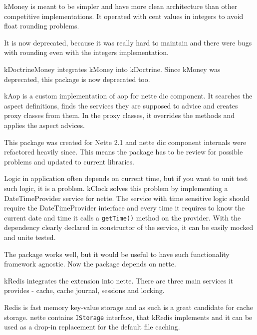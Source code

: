\gls{kMoney} is meant to be simpler and have more clean architecture than other competitive implementations. It operated with cent values in integers to avoid float rounding problems.

It is now deprecated, because it was really hard to maintain and there were bugs with rounding even with the integers implementation.

 \label{sec:state:doctrine-money}

\gls{kDoctrineMoney} integrates \gls{kMoney} into \gls{kDoctrine}. Since \gls{kMoney} was deprecated, this package is now deprecated too.

 \label{sec:state:aop}

\gls{kAop} is a custom implementation of \gls{aop} for \gls{nette} \gls{dic} component. It searches the aspect definitions, finds the services they are supposed to advice and creates proxy classes from them. In the proxy classes, it overrides the methods and applies the aspect advices.

This package was created for Nette 2.1 and \gls{nette} \gls{dic} component internals were refactored heavily since. This means the package has to be review for possible problems and updated to current libraries.

 \label{sec:state:clock}

Logic in application often depends on current time, but if you want to unit test such logic, it is a problem. \gls{kClock} solves this problem by implementing a DateTimeProvider service for \gls{nette}. The service with time sensitive logic should require the DateTimeProvider interface and every time it requires to know the current date and time it calls a \lstinline{getTime()} method on the provider. With the dependency clearly declared in constructor of the service, it can be easily mocked and unite tested.

The package works well, but it would be useful to have such functionality framework agnostic. Now the package depends on \gls{nette}.

 \label{sec:state:redis}

\gls{kRedis} integrates the  extension  into \gls{nette}. There are three main services it provides - cache, cache journal, sessions and locking.

Redis is fast memory key-value storage and as such is a great candidate for cache storage. \gls{nette} contains \lstinline{IStorage} interface, that \gls{kRedis} implements and it can be used as a drop-in replacement for the default file caching.

